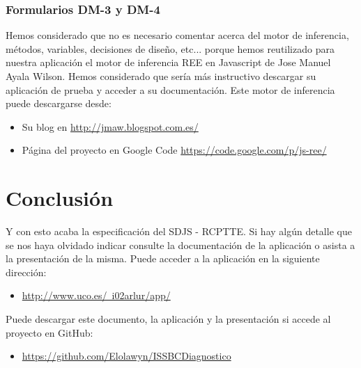 \documentclass[a4paper,11pt]{article}
\begin{document}
			\subsubsection{Formularios DM-3 y DM-4}
			Hemos considerado que no es necesario comentar acerca del motor de
			inferencia, métodos, variables, decisiones de diseño, etc... porque hemos
			reutilizado para nuestra aplicación el motor de inferencia REE en Javascript
			de Jose Manuel Ayala Wilson. Hemos considerado que sería más instructivo
			descargar su aplicación de prueba y acceder a su documentación. Este motor de
			inferencia puede descargarse desde:
			\begin{itemize}
			  \item Su blog en
			  \href{http://jmaw.blogspot.com.es/}{http://jmaw.blogspot.com.es/}
			  \item Página del proyecto en Google Code 
			  \href{https://code.google.com/p/js-ree/}{https://code.google.com/p/js-ree/}
			\end{itemize}
		\section{Conclusión}
		Y con esto acaba la especificación del SDJS - RCPTTE. Si hay algún detalle
		que se nos haya olvidado indicar consulte la documentación de la aplicación o
		asista a la presentación de la misma. Puede acceder a la aplicación en la
		siguiente dirección:
		\begin{itemize}
			  \item
			  \href{http://www.uco.es/~i02arlur/app/}{http://www.uco.es/~i02arlur/app/}
		\end{itemize}
		Puede descargar este documento, la aplicación y la presentación si accede al
		proyecto en GitHub:
		\begin{itemize}
			  \item
			  \href{https://github.com/Elolawyn/ISSBCDiagnostico}{https://github.com/Elolawyn/ISSBCDiagnostico}
		\end{itemize}
\end{document}
